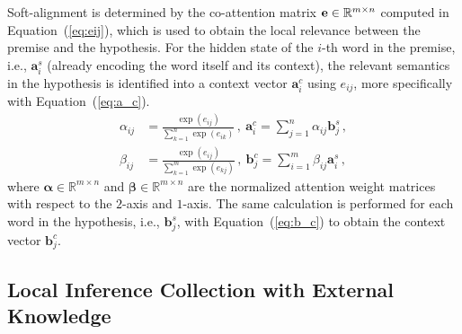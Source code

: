 \documentclass[11pt,a4paper]{article}
\newcommand{\vect}[1]{\bm{#1}}
\newcommand{\mat}[1]{\bf{#1}}
\newcommand{\RR}{\mathbb{R}}
\begin{document}
Soft-alignment is determined by the co-attention matrix ${\mat e} \in \RR^{m \times n}$ computed in Equation~(\ref{eq:eij}), which is used to obtain the local relevance between the premise and the hypothesis. For the hidden state of the $i$-th word in the premise, i.e., ${\vect a}^s_i$ (already encoding the word itself and its context), the relevant semantics in the hypothesis is identified into a context vector ${\vect a}^c_i$ using $e_{ij}$, more specifically with Equation~(\ref{eq:a_c}).
\begin{align}
\label{eq:a_c}
\alpha_{ij} & = \frac{\exp(e_{ij})}{\sum_{k=1}^{n}\exp(e_{ik})} \,, ~{\vect a}^c_i =\sum_{j=1}^{n}\alpha_{ij} {\vect b}^s_j \,,\\
\label{eq:b_c}
\beta_{ij} & = \frac{\exp(e_{ij})}{\sum_{k=1}^{m}\exp(e_{kj})} \,, ~{\vect b}^c_j =\sum_{i=1}^{m}\beta_{ij} {\vect a}^s_i \,,
\end{align}
\noindent where ${\vect \alpha} \in \RR^{m \times n}$ and ${\vect \beta} \in \RR^{m \times n}$ are the normalized attention weight matrices with respect to the $2$-axis and $1$-axis. The same calculation is performed for each word in the hypothesis, i.e., ${\vect b}^s_j$, with Equation~(\ref{eq:b_c}) to obtain the context vector ${\vect b}^c_j$. 

\subsection{Local Inference Collection with External Knowledge}
\end{document}

